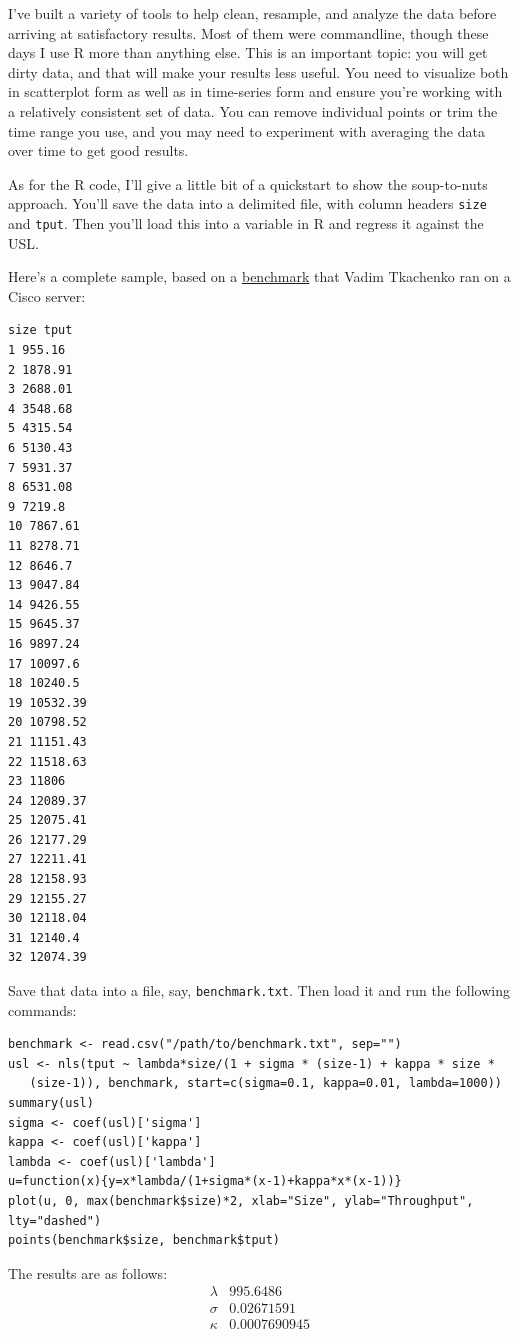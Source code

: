 \documentclass{vivid_layout}
\begin{document}
I've built a variety of tools to help clean, resample, and analyze the data
before arriving at satisfactory results. Most of them were commandline, though
these days I use R more than anything else. This is an important topic:
you will get dirty data, and that will
make your results less useful. You need to visualize both in scatterplot form as
well as in time-series form and ensure you're working with a relatively
consistent set of data. You can remove individual points or trim the time range
you use, and you may need to experiment with averaging the data over time to get
good results.

As for the R code, I'll give a little bit of a quickstart to show the
soup-to-nuts approach.  You'll save the data into a delimited file, with column
headers \texttt{size} and \texttt{tput}. Then you'll load this into a variable
in R and regress it against the USL.

Here's a complete sample, based on a
\href{https://www.percona.com/docs/wiki/benchmark:cisco:scale:start}{benchmark}
that Vadim Tkachenko ran on a Cisco server:

\begin{verbatim}
size tput
1 955.16
2 1878.91
3 2688.01
4 3548.68
5 4315.54
6 5130.43
7 5931.37
8 6531.08
9 7219.8
10 7867.61
11 8278.71
12 8646.7
13 9047.84
14 9426.55
15 9645.37
16 9897.24
17 10097.6
18 10240.5
19 10532.39
20 10798.52
21 11151.43
22 11518.63
23 11806
24 12089.37
25 12075.41
26 12177.29
27 12211.41
28 12158.93
29 12155.27
30 12118.04
31 12140.4
32 12074.39
\end{verbatim}

Save that data into a file, say, \texttt{benchmark.txt}. Then load it and run the following commands:

\begin{verbatim}
benchmark <- read.csv("/path/to/benchmark.txt", sep="")
usl <- nls(tput ~ lambda*size/(1 + sigma * (size-1) + kappa * size *
   (size-1)), benchmark, start=c(sigma=0.1, kappa=0.01, lambda=1000))
summary(usl)
sigma <- coef(usl)['sigma']
kappa <- coef(usl)['kappa']
lambda <- coef(usl)['lambda']
u=function(x){y=x*lambda/(1+sigma*(x-1)+kappa*x*(x-1))}
plot(u, 0, max(benchmark$size)*2, xlab="Size", ylab="Throughput", lty="dashed")
points(benchmark$size, benchmark$tput)
\end{verbatim}

The results are as follows:
\[
\begin{array}{ll}
			\lambda&995.6486 \\
     \sigma & 0.02671591 \\
			       \kappa & 0.0007690945 \\
\end{array}
\]
\end{document}
